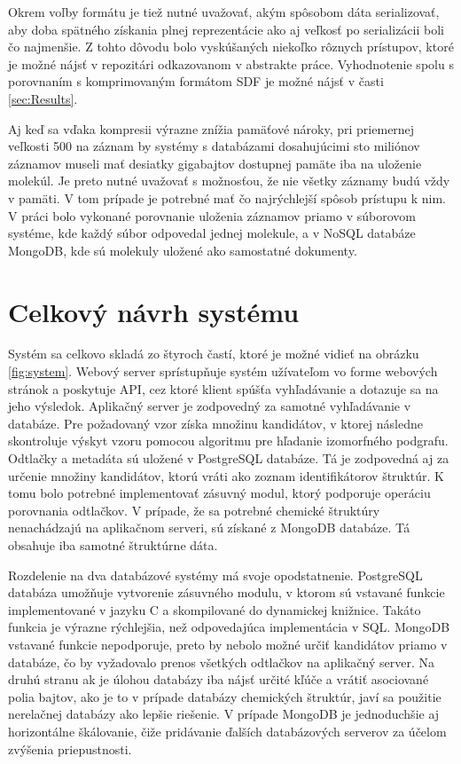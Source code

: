 \documentclass[slovak]{ExcelAtFIT} %
\begin{document}
Okrem voľby formátu je tiež nutné uvažovať, akým spôsobom dáta serializovať, aby doba spätného získania plnej reprezentácie ako aj veľkosť po serializácii boli čo najmenšie. Z tohto dôvodu bolo vyskúšaných niekoľko rôznych prístupov, ktoré je možné nájsť v repozitári odkazovanom v abstrakte práce. Vyhodnotenie spolu s porovnaním s komprimovaným formátom SDF je možné nájsť v časti \ref{sec:Results}.

Aj keď sa vďaka kompresii výrazne znížia pamä\-ťové nároky, pri priemernej veľkosti \SI{500}{\byte} na záznam by systémy s databázami dosahujúcimi sto miliónov zá\-zna\-mov museli mať desiatky gigabajtov dostupnej pamäte iba na uloženie molekúl. Je preto nutné uvažovať s možnosťou, že nie všetky záznamy budú vždy v pamäti. V tom prípade je potrebné mať čo najrýchlejší spôsob prístupu k nim. V práci bolo vykonané porovnanie uloženia záznamov priamo v súborovom systéme, kde každý súbor odpovedal jednej molekule, a v NoSQL databáze MongoDB, kde sú molekuly uložené ako samostatné dokumenty.

\section{Celkový návrh systému}
Systém sa celkovo skladá zo štyroch častí, ktoré je možné vidieť na obrázku \ref{fig:system}. Webový server sprístupňuje systém užívateľom vo forme webových stránok a poskytuje API, cez ktoré klient spúšťa vyhľadávanie a dotazuje sa na jeho výsledok. Aplikačný server je zodpovedný za samotné vyhľadávanie v databáze. Pre požadovaný vzor získa množinu kandidátov, v ktorej následne skontroluje výskyt vzoru pomocou algoritmu pre hľadanie izomorfného podgrafu. Odtlačky a metadáta sú uložené v PostgreSQL databáze. Tá je zodpovedná aj za určenie množiny kandidátov, ktorú vráti ako zoznam identifikátorov štruktúr. K tomu bolo potrebné implementovať zásuvný modul, ktorý podporuje operáciu porovnania odtlačkov. V prípade, že sa potrebné chemické štruktúry nenachádzajú na aplikačnom serveri, sú získané z MongoDB databáze. Tá obsahuje iba samotné štruktúrne dáta.

Rozdelenie na dva databázové systémy má svoje opodstatnenie. PostgreSQL databáza umožňuje vytvorenie zásuvného modulu, v ktorom sú vstavané funkcie implementované v jazyku C a skompilované do dynamickej knižnice. Takáto funkcia je výrazne rýchlejšia, než odpovedajúca implementácia v SQL. MongoDB vstavané funkcie nepodporuje, preto by nebolo možné určiť kandidátov priamo v databáze, čo by vyžadovalo prenos všetkých odtlačkov na aplikačný server. Na druhú stranu ak je úlohou databázy iba nájsť určité kľúče a vrátiť asociované polia bajtov, ako je to v prípade databázy chemických štruktúr, javí sa použitie nerelačnej databázy ako lepšie riešenie. V prípade MongoDB je jednoduchšie aj horizontálne škálovanie, čiže pridávanie ďalších databázových serverov za účelom zvýšenia priepustnosti.
\end{document}
